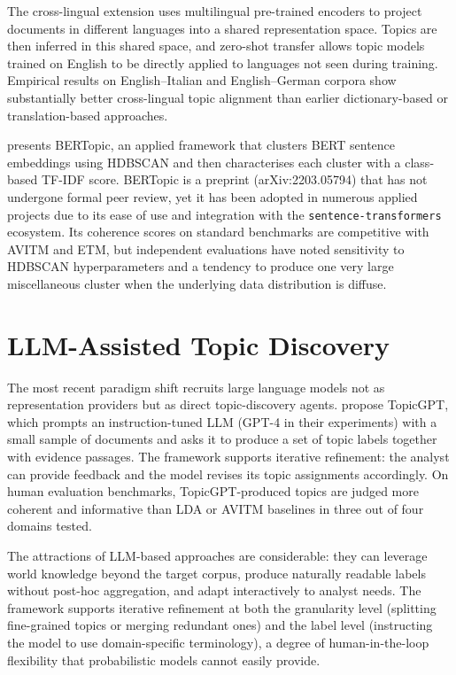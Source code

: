 \documentclass[11pt,a4paper]{article}
\begin{document}
The cross-lingual extension \parencite{bianchi2021crosslingual} uses
multilingual pre-trained encoders to project documents in different
languages into a shared representation space.
Topics are then inferred in this shared space, and zero-shot transfer
allows topic models trained on English to be directly applied to
languages not seen during training.
Empirical results on English--Italian and English--German corpora show
substantially better cross-lingual topic alignment than earlier
dictionary-based or translation-based approaches.

\textcite{grootendorst2022bertopic} presents BERTopic, an applied
framework that clusters BERT sentence embeddings using HDBSCAN and then
characterises each cluster with a class-based TF-IDF score.
BERTopic is a preprint (arXiv:2203.05794) that has not undergone
formal peer review, yet it has been adopted in numerous applied
projects due to its ease of use and integration with the
\texttt{sentence-transformers} ecosystem.
Its coherence scores on standard benchmarks are competitive with
AVITM and ETM, but independent evaluations have noted sensitivity
to HDBSCAN hyperparameters and a tendency to produce one very large
miscellaneous cluster when the underlying data distribution is diffuse.

\section{LLM-Assisted Topic Discovery}
\label{sec:llm}

The most recent paradigm shift recruits large language models not as
representation providers but as direct topic-discovery agents.
\textcite{pham2024topicgpt} propose TopicGPT, which prompts an
instruction-tuned LLM (GPT-4 in their experiments) with a small
sample of documents and asks it to produce a set of topic labels
together with evidence passages.
The framework supports iterative refinement: the analyst can provide
feedback and the model revises its topic assignments accordingly.
On human evaluation benchmarks, TopicGPT-produced topics are judged
more coherent and informative than LDA or AVITM baselines in three out
of four domains tested.

The attractions of LLM-based approaches are considerable: they can
leverage world knowledge beyond the target corpus, produce
naturally readable labels without post-hoc aggregation, and adapt
interactively to analyst needs.
The framework supports iterative refinement at both the granularity
level (splitting fine-grained topics or merging redundant ones) and
the label level (instructing the model to use domain-specific
terminology), a degree of human-in-the-loop flexibility that
probabilistic models cannot easily provide.
\end{document}
